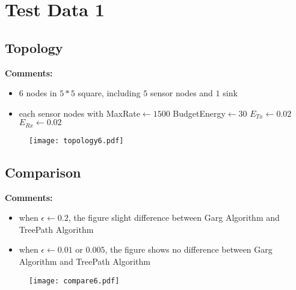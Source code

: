 \section{Test Data 1}
\subsection{Topology}
\textbf{Comments:}
\begin{itemize}
\item $6$ nodes in $5*5$ square, including $5$ sensor nodes and $1$ sink
\item each sensor nodes with MaxRate$\leftarrow 1500$ BudgetEnergy$\leftarrow 30$ $E_{Tx}\leftarrow 0.02$ $E_{Rx}\leftarrow 0.02$
\end{itemize}
\begin{figure}[h]
\centering
\texttt{[image: topology6.pdf]}
\end{figure}

\subsection{Comparison}
\textbf{Comments:}
\begin{itemize}
\item when $\epsilon \leftarrow 0.2$, the figure slight difference between Garg Algorithm and TreePath Algorithm 
\item when $\epsilon \leftarrow 0.01$ or $0.005$, the figure shows no difference between Garg Algorithm and TreePath Algorithm 
\end{itemize}
\begin{figure}[h]
\centering
\texttt{[image: compare6.pdf]}
\end{figure}
